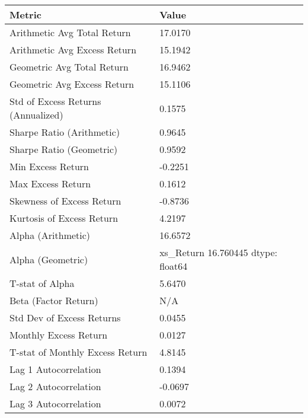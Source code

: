 \begin{tabular}{ll}
\toprule
Metric & Value \\
\midrule
Arithmetic Avg Total Return & 17.0170 \\
Arithmetic Avg Excess Return & 15.1942 \\
Geometric Avg Total Return & 16.9462 \\
Geometric Avg Excess Return & 15.1106 \\
Std of Excess Returns (Annualized) & 0.1575 \\
Sharpe Ratio (Arithmetic) & 0.9645 \\
Sharpe Ratio (Geometric) & 0.9592 \\
Min Excess Return & -0.2251 \\
Max Excess Return & 0.1612 \\
Skewness of Excess Return & -0.8736 \\
Kurtosis of Excess Return & 4.2197 \\
Alpha (Arithmetic) & 16.6572 \\
Alpha (Geometric) & xs_Return    16.760445
dtype: float64 \\
T-stat of Alpha & 5.6470 \\
Beta (Factor Return) & N/A \\
Std Dev of Excess Returns & 0.0455 \\
Monthly Excess Return & 0.0127 \\
T-stat of Monthly Excess Return & 4.8145 \\
Lag 1 Autocorrelation & 0.1394 \\
Lag 2 Autocorrelation & -0.0697 \\
Lag 3 Autocorrelation & 0.0072 \\
\bottomrule
\end{tabular}
